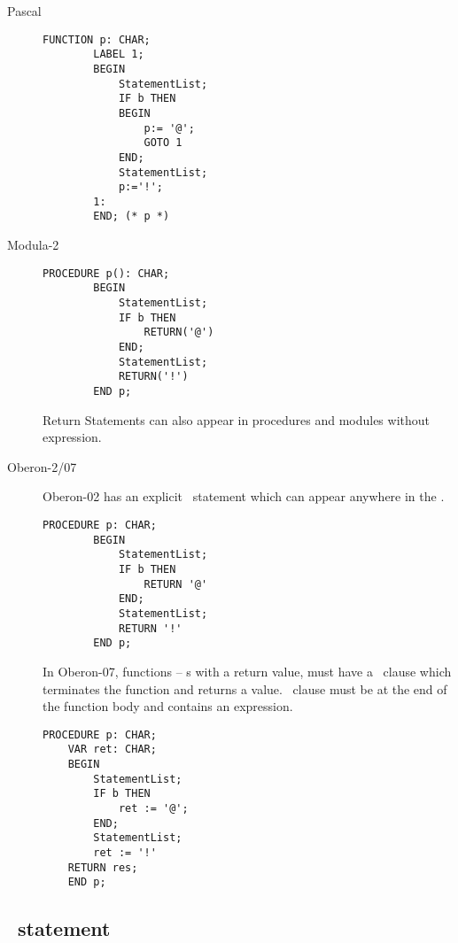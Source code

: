 \documentclass[10pt]{article}
\begin{document}
\begin{description}
    \item[Pascal] 
     
    \begin{lstlisting}[style=example]   
        FUNCTION p: CHAR; 
        LABEL 1;
        BEGIN
            StatementList;
            IF b THEN
            BEGIN 
                p:= '@';
                GOTO 1 
            END;
            StatementList; 
            p:='!';
        1:
        END; (* p *)
        \end{lstlisting}
    
        \item[Modula-2] 
         
        \begin{lstlisting}[style=example]   
        PROCEDURE p(): CHAR; 
        BEGIN
            StatementList; 
            IF b THEN
                RETURN('@') 
            END; 
            StatementList;
            RETURN('!')
        END p;
        \end{lstlisting}
        Return Statements can also appear in procedures and modules without expression.
    
        \item[Oberon-2/07] Oberon-02 has an explicit \RETURN\ statement which can appear anywhere in the \PROCEDURE.
       
        \begin{lstlisting}[style=example]   
        PROCEDURE p: CHAR; 
        BEGIN
            StatementList; 
            IF b THEN
                RETURN '@' 
            END; 
            StatementList;
            RETURN '!'
        END p;
        \end{lstlisting}

    In Oberon-07, functions -- \PROCEDURE s with a return value, must have a \RETURN\ clause which terminates the function and returns a value. \RETURN\ clause must be at the end of the function body and contains an expression.

    \begin{lstlisting}[style=example]   
    PROCEDURE p: CHAR;
    VAR ret: CHAR; 
    BEGIN
        StatementList; 
        IF b THEN
            ret := '@'; 
        END; 
        StatementList;
        ret := '!'
    RETURN res;
    END p;
    \end{lstlisting}
\end{description}

\subsection{\IF\ statement}
\end{document}
